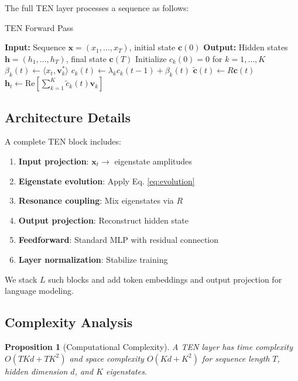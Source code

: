 \documentclass[11pt,letterpaper]{article}
\newtheorem{proposition}[theorem]{Proposition}
\newcommand{\inner}[2]{\langle #1, #2 \rangle}
\begin{document}
The full TEN layer processes a sequence as follows:

\begin{algorithm}[H]
\caption{TEN Forward Pass}
\begin{algorithmic}[1]
\State \textbf{Input:} Sequence $\mathbf{x} = (x_1, \ldots, x_T)$, initial state $\mathbf{c}(0)$
\State \textbf{Output:} Hidden states $\mathbf{h} = (h_1, \ldots, h_T)$, final state $\mathbf{c}(T)$
\State Initialize $c_k(0) = 0$ for $k = 1, \ldots, K$
        \State $\beta_k(t) \gets \inner{x_t}{\mathbf{v}_k^*}$ 
        \State $c_k(t) \gets \lambda_k c_k(t-1) + \beta_k(t)$ 
    \EndFor
    \State $\tilde{\mathbf{c}}(t) \gets R \mathbf{c}(t)$ 
    \State $\mathbf{h}_t \gets \text{Re}\left[\sum_{k=1}^{K} \tilde{c}_k(t) \mathbf{v}_k\right]$ 
\EndFor
\end{algorithmic}
\end{algorithm}

\subsection{Architecture Details}

A complete TEN block includes:

\begin{enumerate}
    \item \textbf{Input projection}: $\mathbf{x}_t \to$ eigenstate amplitudes
    \item \textbf{Eigenstate evolution}: Apply Eq. \ref{eq:evolution}
    \item \textbf{Resonance coupling}: Mix eigenstates via $R$
    \item \textbf{Output projection}: Reconstruct hidden state
    \item \textbf{Feedforward}: Standard MLP with residual connection
    \item \textbf{Layer normalization}: Stabilize training
\end{enumerate}

We stack $L$ such blocks and add token embeddings and output projection for language modeling.

\subsection{Complexity Analysis}

\begin{proposition}[Computational Complexity]
A TEN layer has time complexity $O(TKd + TK^2)$ and space complexity $O(Kd + K^2)$ for sequence length $T$, hidden dimension $d$, and $K$ eigenstates.
\end{proposition}
\end{document}
